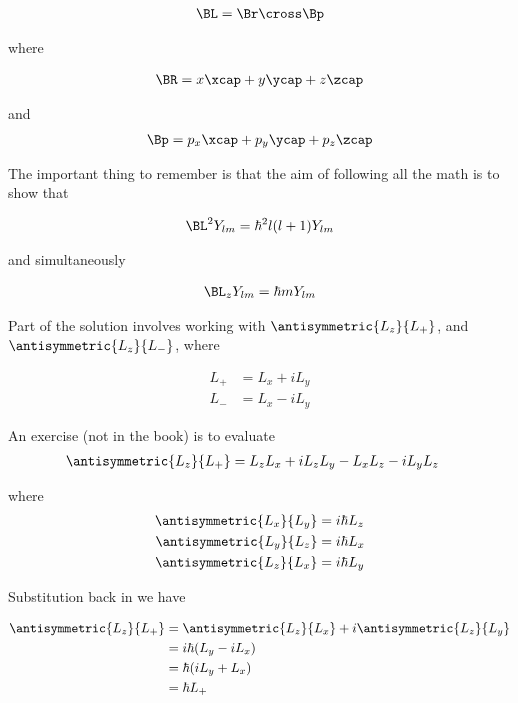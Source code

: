 \begin{align*}
\BL = \Br \cross \Bp
\end{align*}

where

\begin{align*}
\BR = x \xcap + y\ycap + z\zcap
\end{align*}

and
\begin{align*}
\Bp = p_x \xcap + p_y\ycap + p_z\zcap
\end{align*}

The important thing to remember is that the aim of following all the math is to show that

\begin{align*}
\BL^2 Y_{lm} = \hbar^2 l (l+1) Y_{lm}
\end{align*}

and simultaneously

\begin{align*}
\BL_z Y_{lm} = \hbar m Y_{lm}
\end{align*}

Part of the solution involves working with $\antisymmetric{L_z}{L_{+}}$, and $\antisymmetric{L_z}{L_{-}}$, where

\begin{align*}
L_{+} &= L_x + i L_y \\
L_{-} &= L_x - i L_y
\end{align*}

An exercise (not in the book) is to evaluate
\begin{align}\label{eqn:PHY356F:4000}
\antisymmetric{L_z}{L_{+}}
&= L_z L_x + i L_z L_y - L_x L_z - i L_y L_z
\end{align}

where
\begin{align}\label{eqn:PHY356F:5000}
\antisymmetric{L_x}{L_y}  &= i \hbar L_z \\
\antisymmetric{L_y}{L_z}  &= i \hbar L_x \\
\antisymmetric{L_z}{L_x}  &= i \hbar L_y
\end{align}

Substitution back in  we have

\begin{align*}
\antisymmetric{L_z}{L_{+}}
&=
\antisymmetric{L_z}{L_x}
+ i \antisymmetric{L_z}{L_y}  \\
&=
i \hbar ( L_y - i L_x ) \\
&=
\hbar ( i L_y +  L_x ) \\
&=
\hbar L_{+}
\end{align*}
